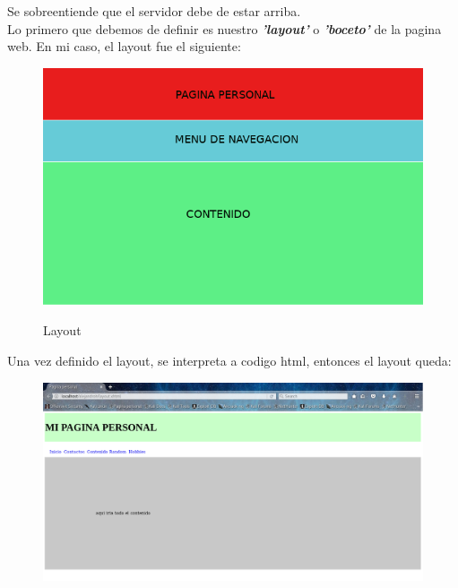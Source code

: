 \documentclass[12pt,letterpaper, spanish]{article}
\begin{document}
\begin{flushleft}
Se sobreentiende que el servidor debe de estar arriba.\\
Lo primero que debemos de definir es nuestro {\bf {\em 'layout'}} o {\bf {\em 'boceto'}} de la pagina web. En mi caso, el layout fue el siguiente:\\
\vspace{-5mm}
\begin{center}
\begin{figure}[h]
\includegraphics[width=400pt]{./imgs/plantilla.png}
\vspace{-8mm}
{\em{\caption {Layout}}}\label{figure 1}
\end{figure}
\end{center}
\vspace{-1cm}
Una vez definido el layout, se interpreta a codigo html, entonces el layout queda:
\newpage
\vspace{-3cm}
\begin{center}
\begin{figure}[h!]
\includegraphics[scale=0.3]{./imgs/layout.png}

\end{figure}
\end{center}
\end{flushleft}
\end{document}
